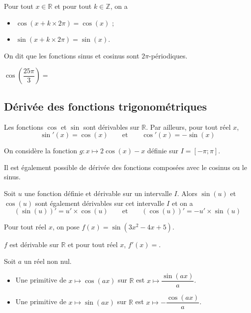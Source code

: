 \documentclass[11pt,fleqn, openany]{book} %
\begin{document}
\begin{proposition}Pour tout $x\in\mathbb{R}$ et pour tout $k\in\mathbb{Z}$, on a
\begin{itemize}
\item $\cos (x+k\times 2\pi)=\cos (x)$ ;
\item $\sin (x+k\times 2\pi) = \sin (x)$.
\end{itemize}
On dit que les fonctions sinus et cosinus sont $2\pi$-périodiques. \end{proposition}

\begin{example}
$\cos \left( \dfrac{25\pi}{3}\right)= $
\end{example}

\subsection{Dérivée des fonctions trigonométriques}

\begin{proposition}Les fonctions $\cos$ et $\sin$ sont dérivables sur $\mathbb{R}$. Par ailleurs, pour tout réel $x$,
\[\sin'(x)=\cos(x) \qquad \text{et}\qquad \cos'(x)=-\sin(x)\]
\vspace{-0.5cm}\end{proposition}

\begin{example}On considère la fonction $g: x\mapsto 2\cos(x)-x$ définie sur $I=[-\pi;\pi]$. 

\vskip270pt

\end{example}


Il est également possible de dérivée des fonctions composées avec le cosinus ou le sinus.
\begin{proposition}Soit $u$ une fonction définie et dérivable sur un intervalle $I$. Alors $\sin (u)$ et $\cos(u)$ sont également dérivables sur cet intervalle $I$ et on a
\[(\sin(u))'=u'\times \cos(u) \qquad \text{et}\qquad (\cos(u))'=-u'\times \sin(u)\]
\vspace{-0.5cm}\end{proposition}



\begin{example}Pour tout réel $x$, on pose $f(x)=\sin(3x^2-4x+5)$. 

$f$ est dérivable sur $\mathbb{R}$ et pour tout réel $x$, $f'(x)=$.\end{example}

\begin{proposition}Soit $a$ un réel non nul.
\begin{itemize}
\item Une primitive de $x\mapsto \cos(ax)$ sur $\mathbb{R}$ est $x\mapsto \dfrac{\sin(ax)}{a}$.
\item Une primitive de $x\mapsto \sin(ax)$ sur $\mathbb{R}$ est $x\mapsto -\dfrac{\cos(ax)}{a}$.
\end{itemize}\end{proposition}
\end{document}
